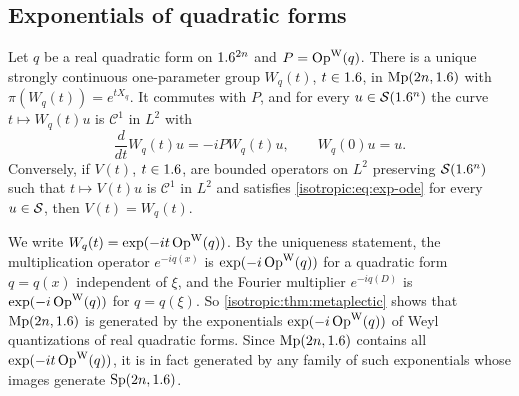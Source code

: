 \subsection{Exponentials of quadratic forms}

\begin{proposition}\label{isotropic:prop:exponentials}
Let $q$ be a real quadratic form on $1.6^{2n}$ and $P=\operatorname{Op}^{\mathrm{W}}(q)$. There is a
unique strongly continuous one-parameter group $W_q(t)$, $t\in1.6$, in
$\mathrm{Mp}(2n,1.6)$ with $\pi(W_q(t))=e^{tX_q}$. It commutes with $P$, and for
every $u\in\mathcal{S}(1.6^n)$ the curve $t\mapsto W_q(t)u$ is $\mathcal C^1$ in $L^2$ with
\begin{equation}\label{isotropic:eq:exp-ode}
  \frac{d}{dt}W_q(t)u=-iPW_q(t)u,\qquad W_q(0)u=u .
\end{equation}
Conversely, if $V(t)$, $t\in1.6$, are bounded operators on $L^2$ preserving
$\mathcal{S}(1.6^n)$ such that $t\mapsto V(t)u$ is $\mathcal C^1$ in $L^2$ and satisfies
\eqref{isotropic:eq:exp-ode} for every $u\in\mathcal{S}$, then $V(t)=W_q(t)$.
\end{proposition}

We write $W_q(t)=\exp(-it\operatorname{Op}^{\mathrm{W}}(q))$. By the uniqueness statement, the
multiplication operator $e^{-iq(x)}$ is $\exp(-i\operatorname{Op}^{\mathrm{W}}(q))$ for a quadratic form
$q=q(x)$ independent of $\xi$, and the Fourier multiplier $e^{-iq(D)}$ is
$\exp(-i\operatorname{Op}^{\mathrm{W}}(q))$ for $q=q(\xi)$. So \cref{isotropic:thm:metaplectic} shows
that $\mathrm{Mp}(2n,1.6)$ is generated by the exponentials $\exp(-i\operatorname{Op}^{\mathrm{W}}(q))$ of
Weyl quantizations of real quadratic forms. Since $\mathrm{Mp}(2n,1.6)$ contains
all $\exp(-it\operatorname{Op}^{\mathrm{W}}(q))$, it is in fact generated by any family of such
exponentials whose images generate $\mathrm{Sp}(2n,1.6)$.

